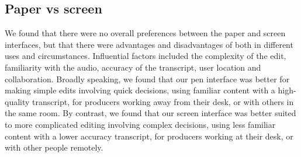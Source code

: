 




\subsection{Paper vs screen}


We found that there were no overall preferences between the paper and screen interfaces, but that there were
advantages and disadvantages of both in different uses and circumstances. Influential factors included the complexity
of the edit, familiarity with the audio, accuracy of the transcript, user location and collaboration.  Broadly speaking,
we found that our pen interface was better for making simple edits involving quick decisions, using familiar content
with a high-quality transcript, for producers working away from their desk, or with others in the same room.  By
contrast, we found that our screen interface was better suited to more complicated editing involving complex decisions,
using less familiar content with a lower accuracy transcript, for producers working at their desk, or with other people
remotely.

